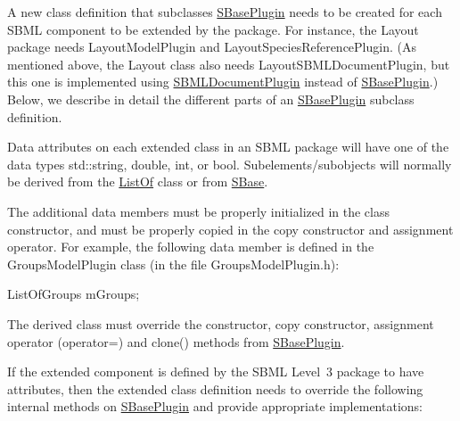 A new class definition that subclasses \hyperlink{class_s_base_plugin}{S\+Base\+Plugin} needs to be created for each S\+B\+ML component to be extended by the package. For instance, the Layout package needs Layout\+Model\+Plugin and Layout\+Species\+Reference\+Plugin. (As mentioned above, the Layout class also needs Layout\+S\+B\+M\+L\+Document\+Plugin, but this one is implemented using \hyperlink{class_s_b_m_l_document_plugin}{S\+B\+M\+L\+Document\+Plugin} instead of \hyperlink{class_s_base_plugin}{S\+Base\+Plugin}.) Below, we describe in detail the different parts of an \hyperlink{class_s_base_plugin}{S\+Base\+Plugin} subclass definition.

Data attributes on each extended class in an S\+B\+ML package will have one of the data types {\ttfamily std\+::string}, {\ttfamily double}, {\ttfamily int}, or {\ttfamily bool}. Subelements/subobjects will normally be derived from the \hyperlink{class_list_of}{List\+Of} class or from \hyperlink{class_s_base}{S\+Base}.

The additional data members must be properly initialized in the class constructor, and must be properly copied in the copy constructor and assignment operator. For example, the following data member is defined in the {\ttfamily Groups\+Model\+Plugin} class (in the file {\ttfamily Groups\+Model\+Plugin.\+h})\+: 
\begin{DoxyCode}
ListOfGroups mGroups;
\end{DoxyCode}


The derived class must override the constructor, copy constructor, assignment operator ({\ttfamily operator=}) and {\ttfamily clone()} methods from \hyperlink{class_s_base_plugin}{S\+Base\+Plugin}.

If the extended component is defined by the S\+B\+ML Level~3 package to have attributes, then the extended class definition needs to override the following internal methods on \hyperlink{class_s_base_plugin}{S\+Base\+Plugin} and provide appropriate implementations\+:

